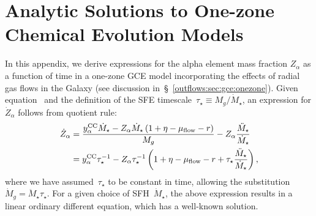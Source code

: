 \documentclass[main.tex]{subfiles}
\begin{document}
\chapter{Analytic Solutions to One-zone Chemical Evolution Models}
\label{outflows:sec:gce-supplement}

In this appendix, we derive expressions for the alpha element mass fraction
$Z_\alpha$ as a function of time in a one-zone GCE model incorporating the
effects of radial gas flows in the Galaxy (see discussion
in~\S~\ref{outflows:sec:gce:onezone}).
Given equation~ and the definition of the
SFE timescale~$\tau_\star \equiv M_g / \dot{M}_\star$, an expression for
$\dot{Z}_\alpha$ follows from quotient rule:
\begin{equation}\begin{split}
\dot{Z}_\alpha &= \frac{
	y_\text{$\alpha$}^\text{CC} \dot{M}_\star -
	Z_\alpha \dot{M}_\star \left(1 + \eta - \mu_{\text{flow}} - r\right)
}{M_g} - Z_\alpha \frac{\ddot{M}_\star}{\dot{M}_\star}
\\
&= y_\text{$\alpha$}^\text{CC} \tau_\star^{-1} - Z_\alpha \tau_\star^{-1}
\left(
1 + \eta - \mu_{\text{flow}} - r + \tau_\star \frac{\ddot{M}_\star}{\dot{M}_\star}
\right),
\label{outflows:eq:zdotalpha-generic}
\end{split}\end{equation}
where we have assumed~$\tau_\star$ to be constant in time, allowing the
substitution~$\dot{M}_g = \ddot{M}_\star \tau_\star$.
For a given choice of SFH~$\dot{M}_\star$, the above expression results in a
linear ordinary different equation, which has a well-known solution.
\end{document}
